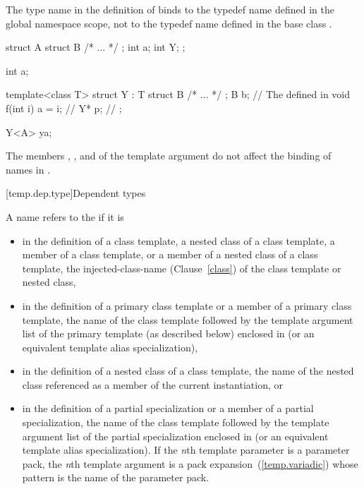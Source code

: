 The type name
in the definition of
binds to the typedef name defined in the global
namespace scope, not to the typedef name
defined in the base class
.
\exitexample
\enterexample

\begin{codeblock}
struct A {
  struct B { /* ... */ };
  int a;
  int Y;
};

int a;

template<class T> struct Y : T {
  struct B { /* ... */ };
  B b;                          // The  defined in 
  void f(int i) { a = i; }      // 
  Y* p;                         // 
};

Y<A> ya;
\end{codeblock}

The members
,
,
and
of the template argument
do not affect the binding of names in
.
\exitexample

[temp.dep.type]{Dependent types}

\pnum
A name refers to the
if it is

\begin{itemize}
\item
in the definition of a class template, a nested class of a class template,
a member of a class template, or a member of a nested class of a class template,
the injected-class-name (Clause~\ref{class}) of the class template or nested class,
\item
in the definition of a primary class template
or a member of a primary class template, the name of the
class template followed by the template argument list of the
primary template (as described below) enclosed in
\tcode{<>} (or an equivalent template alias specialization),
\item
in the definition of a nested class of a class template,
the name of the nested class referenced as a member of the
current instantiation, or
\item
in the definition of a partial specialization
or a member of a partial specialization, the name of
the class template followed by the template argument list of
the partial specialization enclosed in
\tcode{<>} (or an equivalent template alias specialization).
If the \textit{n}th template parameter is
a parameter pack, the \textit{n}th template argument is a pack
expansion~(\ref{temp.variadic}) whose pattern is the name of
the parameter pack.
\end{itemize}

